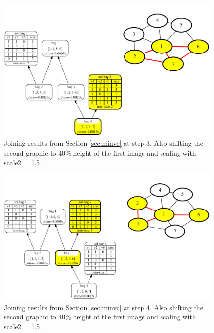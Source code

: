 \documentclass[a4paper, 12pt, bibliography=totoc]{scrartcl}
\begin{document}
\begin{figure}[H]
	\centering
	\includegraphics[width=0.9\linewidth,height=0.9\textheight,keepaspectratio]{images/SVGJOIN/default_06sc153.pdf}
	\caption[Joining results from Section \ref{sec:minvc} at step 3/5]{Joining results from Section \ref{sec:minvc} at step 3. Also shifting the second graphic to $40\%$ height of the first image and scaling with scale2 = 1.5 .}
	\label{fig:joinscaled3}
\end{figure}
\begin{figure}[H]
	\centering
	\includegraphics[width=0.9\linewidth,height=0.9\textheight,keepaspectratio]{images/SVGJOIN/default_06sc154.pdf}
	\caption[Joining results from Section \ref{sec:minvc} at step 4/5]{Joining results from Section \ref{sec:minvc} at step 4. Also shifting the second graphic to $40\%$ height of the first image and scaling with scale2 = 1.5 .}
	\label{fig:joinscaled4}
\end{figure}
\end{document}
